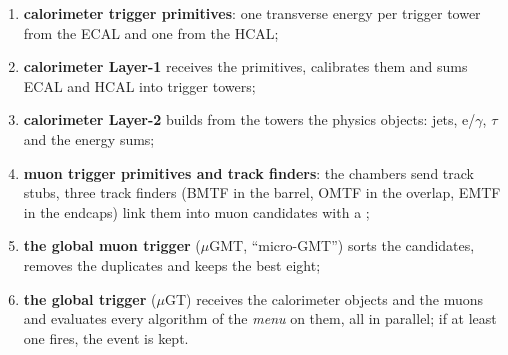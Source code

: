\begin{enumerate}
\item \textbf{calorimeter trigger primitives}: one transverse energy per trigger tower from the ECAL and one from
the HCAL;
\item \textbf{calorimeter Layer-1} receives the primitives, calibrates them and sums ECAL and HCAL into trigger
towers;
\item \textbf{calorimeter Layer-2} builds from the towers the physics objects: jets, e/$\gamma$, $\tau$ and the
energy sums;
\item \textbf{muon trigger primitives and track finders}: the chambers send track stubs, three track finders (BMTF
in the barrel, OMTF in the overlap, EMTF in the endcaps) link them into muon candidates with a \pt;
\item \textbf{the global muon trigger} ($\mu$GMT, ``micro-GMT'') sorts the candidates, removes the duplicates and
keeps the best eight;
\item \textbf{the global trigger} ($\mu$GT) receives the calorimeter objects and the muons and evaluates every
algorithm of the \emph{menu} on them, all in parallel; if at least one fires, the event is kept.
\end{enumerate}

